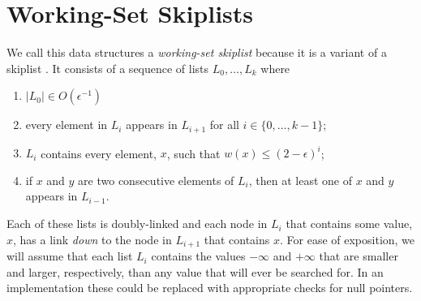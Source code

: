 \documentclass[lotsofwhite]{patmorin}
\begin{document}
%
%
%
%

\section{Working-Set Skiplists}

We call this data structures a \emph{working-set skiplist} because it is a variant of a skiplist \cite{S}.  It consists of a sequence of lists $L_0,\ldots,L_k$ where
\begin{enumerate}
  \item $|L_0|\in O(\epsilon^{-1})$
  \item every element in $L_i$ appears in $L_{i+1}$ for all
  $i\in\{0,\ldots,k-1\}$;
  \item $L_i$ contains every element, $x$, such that $w(x)\le (2-\epsilon)^i$;
  \item if $x$ and $y$ are two consecutive elements of $L_i$, then at
  least one of $x$ and $y$ appears in $L_{i-1}$.
\end{enumerate}

Each of these lists is doubly-linked and each node in $L_i$ that contains some value, $x$, has a link \emph{down} to the node in $L_{i+1}$ that contains $x$.
For ease of exposition, we will assume that each list $L_i$ contains the values $-\infty$ and $+\infty$ that are smaller and larger, respectively, than any value that will ever be searched for.  In an implementation these could be replaced with appropriate checks for null pointers.
\end{document}
